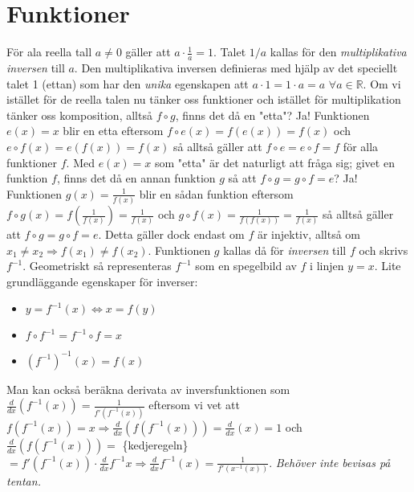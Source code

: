 \chapter{Funktioner}
För ala reella tall $a\neq 0$ gäller att $a\cdot \frac{1}{a}=1$.
Talet $1/a$ kallas för den \emph{multiplikativa inversen} till $a$.
Den multiplikativa inversen definieras med hjälp av det speciellt talet 1 (ettan) som har den \emph{unika} egenskapen att $a\cdot 1 = 1\cdot a=a$ $\forall a\in \mathbb{R}$.
Om vi istället för de reella talen nu tänker oss funktioner och istället för multiplikation tänker oss komposition, alltså $f\circ g$, finns det då en "etta"?
Ja! Funktionen $e(x)=x$ blir en etta eftersom $f\circ e(x)=f(e(x))=f(x)$ och $e\circ f(x)=e(f(x))=f(x)$ så alltså gäller att $f\circ e=e\circ f=f$ för alla funktioner $f$.
Med $e(x)=x$ som "etta" är det naturligt att fråga sig; givet en funktion $f$, finns det då en annan funktion $g$ så att $f\circ g=g\circ f=e$?
Ja! Funktionen $g(x)=\frac{1}{f(x)}$ blir en sådan funktion eftersom $f\circ g(x)=f(\frac{1}{f(x)})=\frac{1}{f(x)}$ och $g\circ f(x)=\frac{1}{f(f(x))}=\frac{1}{f(x)}$ så alltså gäller att $f\circ g=g\circ f=e$.
Detta gäller dock endast om $f$ är injektiv, alltså om $x_1\neq x_2\Rightarrow f(x_1)\neq f(x_2)$.
Funktionen $g$ kallas då för \emph{inversen} till $f$ och skrivs $f^{-1}$.
Geometriskt så representeras $f^{-1}$ som en spegelbild av $f$ i linjen $y=x$.
Lite grundläggande egenskaper för inverser:
\begin{itemize}
    \item $y=f^{-1}(x) \Leftrightarrow x=f(y)$
    \item $f\circ f^{-1}=f^{-1}\circ f=x$
    \item $(f^{-1})^{-1}(x)=f(x)$
\end{itemize}
Man kan också beräkna derivata av inversfunktionen som $\frac{d}{dx}(f^{-1}(x))=\frac{1}{f'(f^{-1}(x))}$
eftersom vi vet att $f(f^{-1}(x))=x\Rightarrow \frac{d}{dx}(f(f^{-1}(x)))=\frac{d}{dx}(x)=1$ och $\frac{d}{dx}(f(f^{-1}(x)))=$ \{kedjeregeln\} $=f'(f^{-1}(x))\cdot \frac{d}{dx}f^{-1}x\Rightarrow \frac{d}{dx}f^{-1}(x)=\frac{1}{f'(x^{-1}(x))}$.
\emph{Behöver inte bevisas på tentan.}
